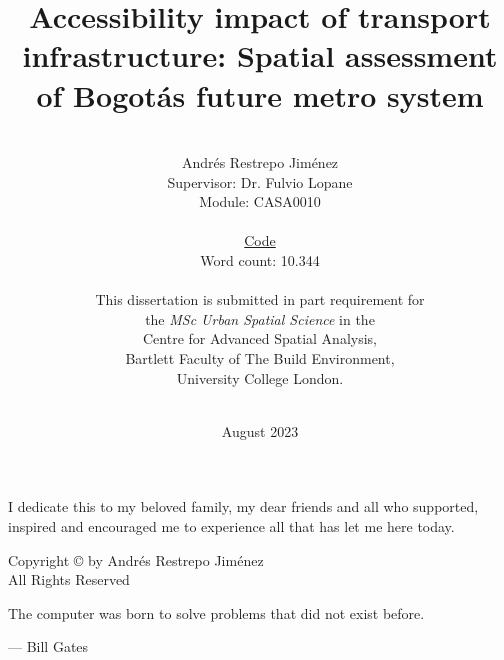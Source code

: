 \documentclass[12pt, a4paper]{report}
\date{August 2023}
\title{Accessibility impact of transport infrastructure: Spatial assessment of Bogot\'{a}\textquotesingle s future metro system}
\author{\\ \Large{Andr\'{e}s Restrepo Jim\'{e}nez}
\\ Supervisor: Dr. Fulvio Lopane 
\\ Module: CASA0010
\\
\\ \href{https://github.com/rpoandres/MSc_USS_Dissertation}{Code}
\\ Word count: 10.344
\\
\\
This dissertation is submitted in part requirement for \\the \textit{MSc Urban Spatial Science} in the \\Centre for Advanced Spatial Analysis, \\Bartlett Faculty of The Build Environment, \\University College London.
\\ \\
}
\begin{document}
      

\thispagestyle{headings}
\maketitle
\FloatBarrier
{}

\thispagestyle{empty}
\begin{abstract}


\end{abstract}
\newpage
\thispagestyle{empty}
\begin{center}
I dedicate this to my beloved family, my dear friends and all who supported, inspired and encouraged me to experience all that has let me here today.
\end{center}

\newpage
\thispagestyle{empty}
\vspace*{\fill}
\begin{center}
Copyright \copyright  {} by Andr\'{e}s Restrepo Jim\'{e}nez \\ All Rights Reserved
\end{center}
\vspace*{\fill}
\newpage
\thispagestyle{empty}
\epigraph{The computer was born to solve problems that did not exist before.}{--- \textup{Bill Gates}}
\end{document}
